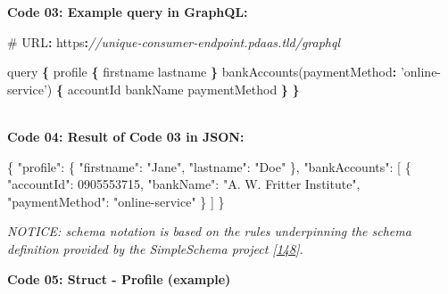 \documentclass[12pt,english,a4paper,titlepage,cleardoublepage=empty,dottedtoc]{report}
\newenvironment{Shaded}{\begin{snugshade}}{\end{snugshade}}
\newcommand{\DataTypeTok}[1]{\textcolor[rgb]{0.13,0.29,0.53}{#1}}
\newcommand{\DecValTok}[1]{\textcolor[rgb]{0.00,0.00,0.81}{#1}}
\newcommand{\StringTok}[1]{\textcolor[rgb]{0.31,0.60,0.02}{#1}}
\newcommand{\CommentTok}[1]{\textcolor[rgb]{0.56,0.35,0.01}{\textit{#1}}}
\newcommand{\OtherTok}[1]{\textcolor[rgb]{0.56,0.35,0.01}{#1}}
\newcommand{\FunctionTok}[1]{\textcolor[rgb]{0.00,0.00,0.00}{#1}}
\newcommand{\OperatorTok}[1]{\textcolor[rgb]{0.81,0.36,0.00}{\textbf{#1}}}
\newcommand{\AttributeTok}[1]{\textcolor[rgb]{0.77,0.63,0.00}{#1}}
\newcommand{\NormalTok}[1]{#1}
\begin{document}
\newpage

\textbf{\protect\hypertarget{code-03_graphql-query}{}{Code 03: Example
query in GraphQL}:}

\begin{Shaded}
\begin{Highlighting}[numbers=left,,]
\NormalTok{# URL}\OperatorTok{:}\NormalTok{ https}\OperatorTok{:}\CommentTok{//unique-consumer-endpoint.pdaas.tld/graphql}

\NormalTok{query }\OperatorTok{\{}
\NormalTok{    profile }\OperatorTok{\{}
\NormalTok{        firstname}
\NormalTok{        lastname}
    \OperatorTok{\}}
    \AttributeTok{bankAccounts}\NormalTok{(}\DataTypeTok{paymentMethod}\OperatorTok{:} \StringTok{'online-service'}\NormalTok{) }\OperatorTok{\{}
\NormalTok{        accountId}
\NormalTok{        bankName}
\NormalTok{        paymentMethod}
    \OperatorTok{\}}
\OperatorTok{\}}
\end{Highlighting}
\end{Shaded}

~\\
\textbf{\protect\hypertarget{code-04_graphql-query-result}{}{Code 04:
Result of Code 03 in JSON}:}

\begin{Shaded}
\begin{Highlighting}[numbers=left,,]
\FunctionTok{\{}
    \DataTypeTok{"profile"}\FunctionTok{:} \FunctionTok{\{}
        \DataTypeTok{"firstname"}\FunctionTok{:} \StringTok{"Jane"}\FunctionTok{,} 
        \DataTypeTok{"lastname"}\FunctionTok{:} \StringTok{"Doe"}
    \FunctionTok{\},}
    \DataTypeTok{"bankAccounts"}\FunctionTok{:} \OtherTok{[}
        \FunctionTok{\{}
            \DataTypeTok{"accountId"}\FunctionTok{:} \DecValTok{0905553715}\FunctionTok{,}
            \DataTypeTok{"bankName"}\FunctionTok{:} \StringTok{"A. W. Fritter Institute"}\FunctionTok{,}
            \DataTypeTok{"paymentMethod"}\FunctionTok{:} \StringTok{"online-service"}
        \FunctionTok{\}}
    \OtherTok{]}
\FunctionTok{\}}
\end{Highlighting}
\end{Shaded}

\newpage

\emph{NOTICE: schema notation is based on the rules underpinning the
schema definition provided by the SimpleSchema project
{[}\protect\hyperlink{ref-web_2017_repo_node-simple-schema}{148}{]}.}

\textbf{\protect\hypertarget{code-05_struct_profile}{}{Code 05: Struct -
Profile (example)}}
\end{document}
